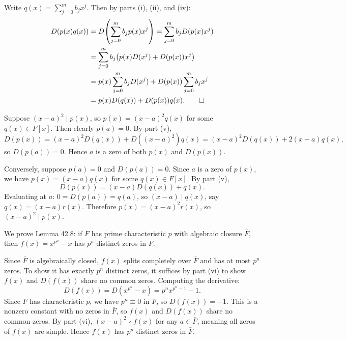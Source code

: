 \begin{solution}[(v)]
  Write $q(x) = \sum_{j=0}^m b_j x^j$. Then by parts (i), (ii), and (iv):
  \begin{align*}
    D(p(x)q(x)) &= D\!\left(\sum_{j=0}^m b_j p(x) x^j\right) = \sum_{j=0}^m b_j D(p(x)x^j) \\
                &= \sum_{j=0}^m b_j\!\left(p(x)D(x^j) + D(p(x))x^j\right) \\
                &= p(x)\sum_{j=0}^m b_j D(x^j) + D(p(x))\sum_{j=0}^m b_j x^j \\
                &= p(x)D(q(x)) + D(p(x))q(x)
  .\qedhere\end{align*}
\end{solution}

\begin{solution}[(vi)]
  Suppose $(x-a)^2 \mid p(x)$, so $p(x) = (x-a)^2 q(x)$ for some $q(x) \in F[x]$. Then clearly $p(a) = 0$. By part (v),
  \[%
    D(p(x)) = (x-a)^2 D(q(x)) + D((x-a)^2)q(x) = (x-a)^2 D(q(x)) + 2(x-a)q(x)
  ,\]%
  so $D(p(a)) = 0$. Hence $a$ is a zero of both $p(x)$ and $D(p(x))$.

  Conversely, suppose $p(a) = 0$ and $D(p(a)) = 0$. Since $a$ is a zero of $p(x)$, we have $p(x) = (x-a)q(x)$ for some $q(x) \in F[x]$. By part (v),
  \[%
    D(p(x)) = (x-a)D(q(x)) + q(x)
  .\]%
  Evaluating at $a$: $0 = D(p(a)) = q(a)$, so $(x - a) \mid q(x)$, say $q(x) = (x-a)r(x)$. Therefore $p(x) = (x-a)^2 r(x)$, so $(x-a)^2 \mid p(x)$.
\end{solution}

\begin{solution}[(vii)]
  We prove Lemma 42.8: if $F$ has prime characteristic $p$ with algebraic closure $\bar{F}$, then $f(x) = x^{p^n} - x$ has $p^n$ distinct zeros in $\bar{F}$.

  Since $\bar{F}$ is algebraically closed, $f(x)$ splits completely over $\bar{F}$ and has at most $p^n$ zeros. To show it has exactly $p^n$ distinct zeros, it suffices by part (vi) to show $f(x)$ and $D(f(x))$ share no common zeros. Computing the derivative:
  \[%
    D(f(x)) = D(x^{p^n} - x) = p^n x^{p^n - 1} - 1
  .\]%
  Since $F$ has characteristic $p$, we have $p^n \equiv 0$ in $F$, so $D(f(x)) = -1$. This is a nonzero constant with no zeros in $\bar{F}$, so $f(x)$ and $D(f(x))$ share no common zeros. By part (vi), $(x - a)^2 \nmid f(x)$ for any $a \in \bar{F}$, meaning all zeros of $f(x)$ are simple. Hence $f(x)$ has $p^n$ distinct zeros in $\bar{F}$.
\end{solution}

